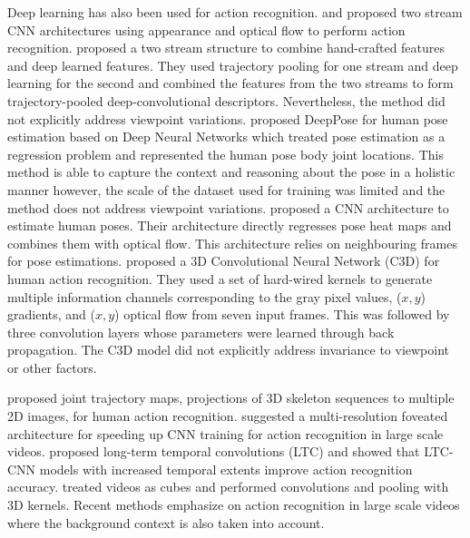 \documentclass[twocolumn]{svjour3}          \smartqed  \usepackage{graphicx}
\begin{document}
Deep learning has also been used for action recognition. \citet{simonyan2014two} and \citet{twoStream_CVPR16} proposed two stream CNN architectures using appearance and optical flow to perform action recognition.\citet{wang2015action} proposed a two stream structure to combine hand-crafted features and deep learned features. They used trajectory pooling for one stream and deep learning for the second and combined the features from the two streams to form trajectory-pooled deep-convolutional descriptors. Nevertheless, the method did not explicitly address viewpoint variations. \citet{toshev2014deeppose} proposed DeepPose for human pose estimation based on Deep Neural Networks which treated pose estimation as a regression problem and represented the human pose body joint locations. This method is able to capture the context and reasoning about the pose in a holistic manner however, the scale of the dataset used for training was limited and the method does not address viewpoint variations. \citet{pfister2015flowing} proposed a CNN architecture to estimate human poses. Their architecture directly regresses pose heat maps and combines them with optical flow. This architecture relies on neighbouring frames for pose estimations. \citet{C3D_pami} proposed a 3D Convolutional Neural Network (C3D) for human action recognition. They used a set of hard-wired kernels to generate multiple information channels corresponding to the gray pixel values, ($x,y$) gradients, and ($x,y$) optical flow from seven input frames. This was followed by three convolution layers whose parameters were learned through back propagation. The C3D model did not explicitly address invariance to viewpoint or other factors.

\citet{wang2016action} proposed joint trajectory maps, projections of 3D skeleton sequences to multiple 2D images, for human action recognition. \citet{karpathy2014large} suggested a multi-resolution foveated architecture for speeding up CNN training for action recognition in large scale videos. \citet{varol2017long} proposed long-term temporal convolutions (LTC) and showed that LTC-CNN models with increased temporal extents improve action recognition accuracy. \citet{tran2015learning} treated videos as cubes and performed convolutions and pooling with 3D kernels. Recent methods \citep{li2016vlad3, zhu2016key, wang2016improving, zhang2016real, su2016hierarchical, wang2016temporal} emphasize on action recognition in large scale videos where the background context is also taken into account. 
\end{document}
